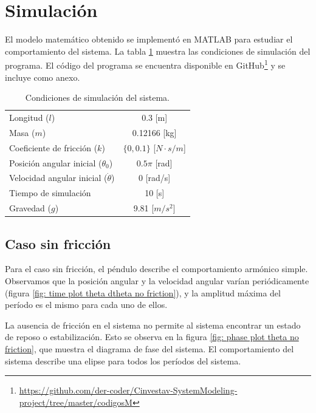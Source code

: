 \section{Simulación}

El modelo matemático obtenido se implementó en MATLAB 
para estudiar el comportamiento del sistema.
La tabla \ref{table: simulation conditions}
muestra las condiciones de simulación del programa.
El código del programa se encuentra disponible en 
GitHub\footnote{\url{https://github.com/der-coder/Cinvestav-SystemModeling-project/tree/master/codigosM}}
y se incluye como anexo.

\begin{table}[hb]
 \begin{center}
\begin{tabular}{lc}
\hline
Longitud ($l$) & 0.3 [m] \\
Masa ($m$) & 0.12166 [kg]\\
Coeficiente de fricción ($k$) & $\{0,0.1\}$ [$N \cdot s / m$] \\
Posición angular inicial ($\theta_0$) & $0.5\pi$ [rad] \\
Velocidad angular inicial ($\dot{\theta}$) & 0 [rad/s] \\
Tiempo de simulación & 10 [s]  \\
Gravedad ($g$) & 9.81 [$m/s^2$]  \\
\hline
 \end{tabular}
 \end{center}
 \caption{Condiciones de simulación del sistema.}
\label{table: simulation conditions}
\end{table}

\subsection{Caso sin fricción}

Para el caso sin fricción, el péndulo describe 
el comportamiento armónico simple. 
Observamos que la posición angular y la velocidad angular
varían periódicamente (figura \ref{fig: time plot theta dtheta no friction}), y la amplitud máxima
del período es el mismo para cada uno de ellos.

La ausencia de fricción en el sistema no permite al sistema
encontrar un estado de reposo o estabilización. 
Esto se observa en la figura \ref{fig: phase plot theta no friction}, que
muestra el diagrama de fase del sistema.
El comportamiento del sistema describe una elipse para todos los períodos del sistema.


